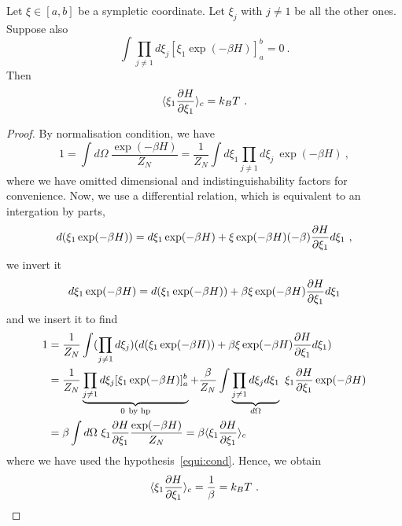     \begin{theorem}
        Let $\xi \in [a,b]$ be a sympletic coordinate. Let $\xi_j$ with $j \neq 1$ be all the other ones. Suppose also 
        \begin{equation}\label{equi:cond}
            \int \prod_{j \neq 1} d \xi_j [\xi_1 \exp(-\beta H)]_a^b = 0 ~.
        \end{equation}
        Then 
        \begin{equation}\label{equi:thm}
            \langle\xi_1 \frac{\partial H}{\partial\xi_1}\rangle_{c} = k_B T ~.
        \end{equation}
    \end{theorem}

    \begin{proof}
        By normalisation condition, we have
        \begin{equation*}
            1 = \int d\Omega ~ \frac{\exp(-\beta H)}{Z_N} = \frac{1}{Z_N} \int d\xi_1 \prod_{j \neq 1} d \xi_j ~ \exp(-\beta H) ~,
        \end{equation*}
        where we have omitted dimensional and indistinguishability factors for convenience.
        Now, we use a differential relation, which is equivalent to an intergation by parts,
        \begin{equation*}
            d(\xi_1 \exp(-\beta H)) = d\xi_1 \exp(-\beta H) + \xi \exp(-\beta H) (-\beta) \frac{\partial H}{\partial\xi_1} d\xi_1  ~,
        \end{equation*}
        we invert it 
        \begin{equation*}
            d\xi_1 \exp(-\beta H) = d(\xi_1 \exp(-\beta H)) + \beta \xi \exp(-\beta H) \frac{\partial H}{\partial\xi_1} d\xi_1
        \end{equation*}
        and we insert it to find
        \begin{equation*}
        \begin{aligned}        
            1 & = \frac{1}{Z_N} \int (\prod_{j \neq 1} d \xi_j) (d(\xi_1 \exp(-\beta H)) + \beta \xi \exp(-\beta H) \frac{\partial H}{\partial\xi_1} d\xi_1) \\ & = \frac{1}{Z_N} \underbrace{\prod_{j \neq 1} d \xi_j [\xi_1 \exp(-\beta H)]_a^b}_{0~\text{by hp}} + \frac{\beta}{Z_N} \int \underbrace{\prod_{j \neq 1} d \xi_j d\xi_1}_{d\Omega} ~ \xi_1 \frac{\partial H}{\partial\xi_1} \exp (-\beta H) \\ & = \beta \int d\Omega ~ \xi_1 \frac{\partial H}{\partial\xi_1} \frac{\exp (- \beta H)}{Z_N} = \beta \langle\xi_1 \frac{\partial H}{\partial\xi_1}\rangle_{c}
        \end{aligned}
        \end{equation*}
        where we have used the hypothesis~\eqref{equi:cond}.
        Hence, we obtain
        \begin{equation*}
            \langle\xi_1 \frac{\partial H}{\partial\xi_1}\rangle_{c} = \frac{1}{\beta} = k_B T ~.
        \end{equation*}
    \end{proof}

